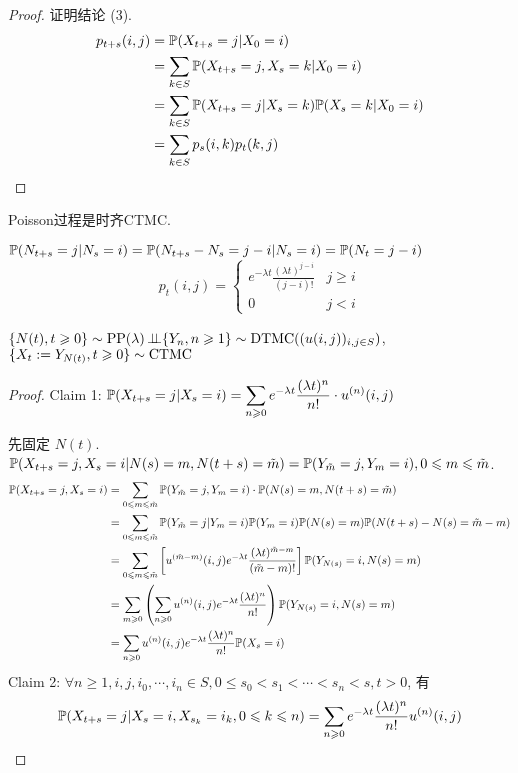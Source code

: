 \begin{proof}
    证明结论 (3).
    \[
    \begin{aligned}
        p_{t+s}(i,j) &=\mathbb{P}(X_{t+s}=j|X_0=i)\\
        &=\sum_{k\in S}\mathbb{P}(X_{t+s}=j,X_s=k|X_0=i)\\
        &=\sum_{k\in S}\mathbb{P}(X_{t+s}=j|X_s=k)\mathbb{P}(X_s=k|X_0=i)\\
        &=\sum_{k\in S}p_s(i,k)p_t(k,j)
    \end{aligned}
    \]
\end{proof}

\begin{example}
    Poisson过程是时齐CTMC.

    $\mathbb{P}(N_{t+s}=j|N_s=i)=\mathbb{P}(N_{t+s}-N_s=j-i|N_s=i)=\mathbb{P}(N_t=j-i)$
    \[
    p_t(i,j)=\begin{cases}
        e^{-\lambda t}\frac{(\lambda t)^{j-i}}{(j-i)!} & j\geq i\\
        0 & j<i
    \end{cases}
    \]
\end{example}

\begin{example}
    $\{N(t),t\geqslant 0\}\sim \operatorname{PP}(\lambda)\operatorname{\perp\!\!\!\perp} \{Y_n,n\geqslant 1\}\sim \operatorname{DTMC}((u(i,j))_{i,j\in S})$, $\{X_t:=Y_{N(t)},t\geqslant 0\}\sim\operatorname{CTMC}$
\end{example}

\begin{proof}
    Claim 1: $\displaystyle\mathbb{P}(X_{t+s}=j|X_s=i)=\sum_{n\geqslant 0}e^{-\lambda t}\frac{(\lambda t)^n}{n!}\cdot u^{(n)}(i,j)$

    先固定 $N(t)$. $\mathbb{P}(X_{t+s}=j,X_s=i|N(s)=m,N(t+s)=\tilde{m})=\mathbb{P}(Y_{\tilde{m}}=j,Y_m=i), 0\leqslant m\leqslant \tilde{m}$.
    \[
    \begin{aligned}
        \mathbb{P}(X_{t+s}=j,X_s=i)&=\sum_{0\leqslant m\leqslant \tilde{m}}
        \mathbb{P}(Y_{\tilde{m}}=j,Y_m=i)\cdot 
        \mathbb{P}(N(s)=m,N(t+s)=\tilde{m})\\
        &=\sum_{0\leqslant m\leqslant \tilde{m}}
        \mathbb{P}(Y_{\tilde{m}}=j|Y_m=i)\mathbb{P}(Y_m=i)
        \mathbb{P}(N(s)=m)\mathbb{P}(N(t+s)-N(s)=\tilde{m}-m)\\
        &=\sum_{0\leqslant m\leqslant \tilde{m}}
        \left[
            u^{(\tilde{m}-m)}(i,j) e^{-\lambda t}\frac{(\lambda t)^{\tilde{m}-m}}{(\tilde{m}-m)!}
        \right]
        \mathbb{P}(Y_{N(s)}=i,N(s)=m)\\
        &=\sum_{m\geqslant 0}
        \left(
            \sum_{n\geqslant 0}u^{(n)}(i,j)e^{-\lambda t}\frac{(\lambda t)^{n}}{n!}
        \right)
        \mathbb{P}(Y_{N(s)}=i,N(s)=m)\\
        &=\sum_{n\geqslant 0}u^{(n)}(i,j)e^{-\lambda t}\frac{(\lambda t)^{n}}{n!}\mathbb{P}(X_s=i)
    \end{aligned}
    \]
    Claim 2: $\forall n\geq 1, i,j,i_0,\cdots,i_n\in S,0\leq s_0<s_1<\cdots<s_n<s,t>0$, 有
    \[
    \mathbb{P}(X_{t+s}=j|X_s=i,X_{s_k}=i_k,0\leqslant k\leqslant n)
    =\sum_{n\geqslant 0}e^{-\lambda t}\frac{(\lambda t)^n}{n!}u^{(n)}(i,j)
    \]
\end{proof}
\newpage